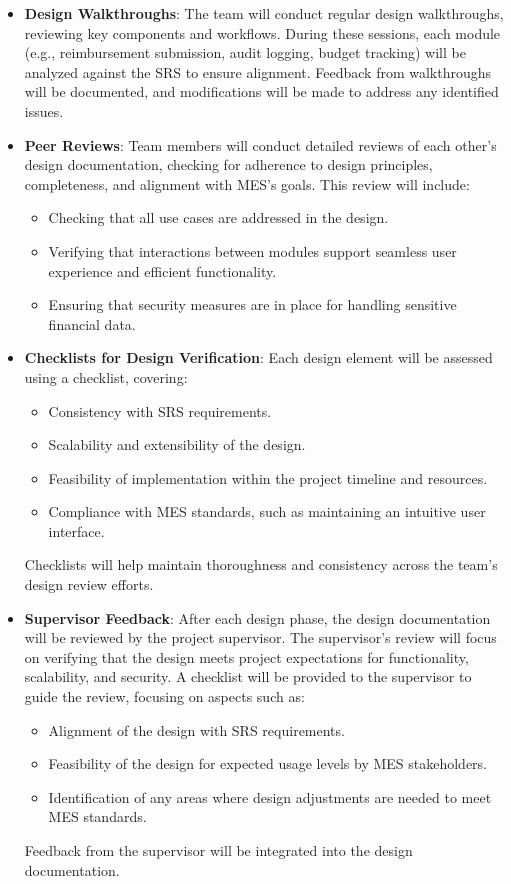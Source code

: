 \documentclass[12pt, titlepage]{article}
\begin{document}
\begin{itemize}
    \item \textbf{Design Walkthroughs}: The team will conduct regular design walkthroughs, reviewing key components and workflows. During these sessions, each module (e.g., reimbursement submission, audit logging, budget tracking) will be analyzed against the SRS to ensure alignment. Feedback from walkthroughs will be documented, and modifications will be made to address any identified issues.

    \item \textbf{Peer Reviews}: Team members will conduct detailed reviews of each other’s design documentation, checking for adherence to design principles, completeness, and alignment with MES’s goals. This review will include:
    \begin{itemize}
        \item Checking that all use cases are addressed in the design.
        \item Verifying that interactions between modules support seamless user experience and efficient functionality.
        \item Ensuring that security measures are in place for handling sensitive financial data.
    \end{itemize}

    \item \textbf{Checklists for Design Verification}: Each design element will be assessed using a checklist, covering:
    \begin{itemize}
        \item Consistency with SRS requirements.
        \item Scalability and extensibility of the design.
        \item Feasibility of implementation within the project timeline and resources.
        \item Compliance with MES standards, such as maintaining an intuitive user interface.
    \end{itemize}
    Checklists will help maintain thoroughness and consistency across the team’s design review efforts.

    \item \textbf{Supervisor Feedback}: After each design phase, the design documentation will be reviewed by the project supervisor. The supervisor’s review will focus on verifying that the design meets project expectations for functionality, scalability, and security. A checklist will be provided to the supervisor to guide the review, focusing on aspects such as:
    \begin{itemize}
        \item Alignment of the design with SRS requirements.
        \item Feasibility of the design for expected usage levels by MES stakeholders.
        \item Identification of any areas where design adjustments are needed to meet MES standards.
    \end{itemize}
    Feedback from the supervisor will be integrated into the design documentation.
\end{itemize}
\end{document}
